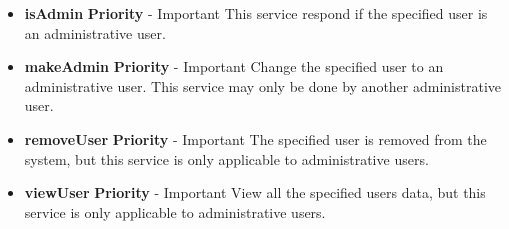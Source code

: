 \documentclass{article}
\begin{document}
		\begin{itemize}
			\item \textbf{isAdmin}
				\newline\textbf{ Priority } - Important
				\newline This service respond if the specified user is an administrative user.
			\item \textbf{makeAdmin}
				\newline\textbf{ Priority } - Important
				\newline Change the specified user to an administrative user. This service may only be done by another administrative user.

			\item \textbf{removeUser}
				\newline\textbf{ Priority } - Important
				\newline The specified user is removed from the system, but this service is only applicable to administrative users. 
			\item \textbf{viewUser}
				\newline\textbf{ Priority } - Important
				\newline View all the specified users data, but this service is only applicable to administrative users. 

		\end{itemize}
\end{document}

